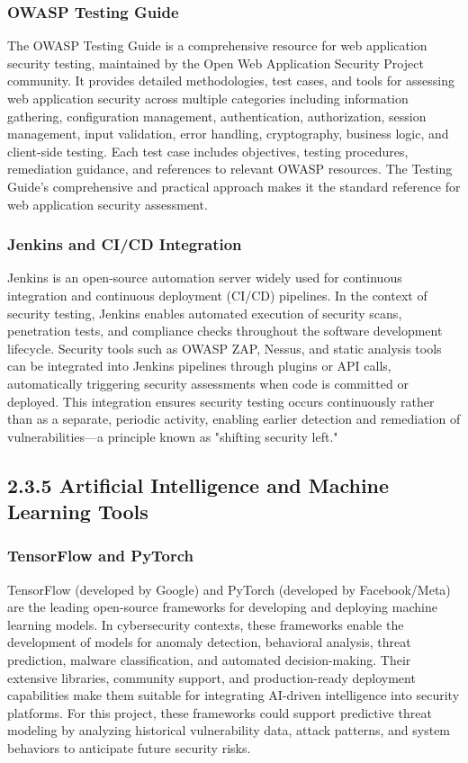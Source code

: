 \documentclass[12pt,a4paper]{report}
\begin{document}
\subsubsection{OWASP Testing Guide}

The OWASP Testing Guide is a comprehensive resource for web application security testing, maintained by the Open Web Application Security Project community. It provides detailed methodologies, test cases, and tools for assessing web application security across multiple categories including information gathering, configuration management, authentication, authorization, session management, input validation, error handling, cryptography, business logic, and client-side testing. Each test case includes objectives, testing procedures, remediation guidance, and references to relevant OWASP resources. The Testing Guide's comprehensive and practical approach makes it the standard reference for web application security assessment.

\subsubsection{Jenkins and CI/CD Integration}

Jenkins is an open-source automation server widely used for continuous integration and continuous deployment (CI/CD) pipelines. In the context of security testing, Jenkins enables automated execution of security scans, penetration tests, and compliance checks throughout the software development lifecycle. Security tools such as OWASP ZAP, Nessus, and static analysis tools can be integrated into Jenkins pipelines through plugins or API calls, automatically triggering security assessments when code is committed or deployed. This integration ensures security testing occurs continuously rather than as a separate, periodic activity, enabling earlier detection and remediation of vulnerabilities—a principle known as "shifting security left."

\subsection{2.3.5 Artificial Intelligence and Machine Learning Tools}

\subsubsection{TensorFlow and PyTorch}

TensorFlow (developed by Google) and PyTorch (developed by Facebook/Meta) are the leading open-source frameworks for developing and deploying machine learning models. In cybersecurity contexts, these frameworks enable the development of models for anomaly detection, behavioral analysis, threat prediction, malware classification, and automated decision-making. Their extensive libraries, community support, and production-ready deployment capabilities make them suitable for integrating AI-driven intelligence into security platforms. For this project, these frameworks could support predictive threat modeling by analyzing historical vulnerability data, attack patterns, and system behaviors to anticipate future security risks.
\end{document}
